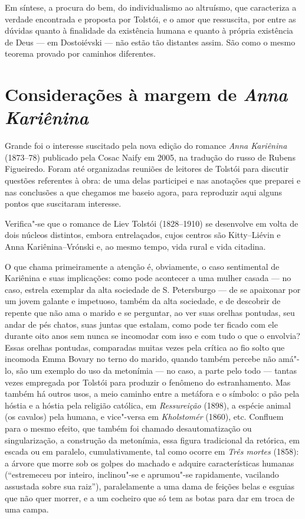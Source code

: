 {{Em síntese, a procura do bem, do individualismo ao altruísmo, que
caracteriza a verdade encontrada e proposta por Tolstói, e o amor que
ressuscita, por entre as dúvidas quanto à finalidade da existência
humana e quanto à própria existência de Deus --- em Dostoiévski --- não estão
tão distantes assim. São como o mesmo teorema provado por caminhos
diferentes.

\chapter{Considerações à margem de \emph{Anna Kariênina}}

Grande foi o interesse suscitado pela nova edição do romance \emph{Anna
Kariênina} (1873--78) publicado pela Cosac Naify em 2005, na tradução do russo de Rubens Figueiredo. Foram até organizadas
reuniões de leitores de Tolstói para discutir questões referentes à
obra: de uma delas participei e nas anotações que preparei e nas
conclusões a que chegamos me baseio agora, para reproduzir aqui alguns
pontos que suscitaram interesse.

Verifica"-se que o romance de Liev Tolstói (1828--1910) se desenvolve em
volta de dois núcleos distintos, embora entrelaçados, cujos centros
são Kitty--Liévin e Anna Kariênina--Vrónski e, ao mesmo tempo, vida
rural e vida citadina.

O que chama primeiramente a atenção é, obviamente, o caso sentimental de
Kariênina e suas implicações: como pode acontecer a uma mulher
casada --- no caso, estrela exemplar da alta sociedade de S.
Petersburgo --- de se apaixonar por um jovem galante e impetuoso, também
da alta sociedade, e de descobrir de repente que não ama o marido e se
perguntar, ao ver suas orelhas pontudas, seu andar de pés chatos, suas
juntas que estalam, como pode ter ficado com ele durante oito anos sem
nunca se incomodar com isso e com tudo o que o envolvia? Essas orelhas
pontudas, comparadas muitas vezes pela crítica ao fio solto que incomoda
Emma Bovary no terno do marido, quando também percebe não amá"-lo, são um
exemplo do uso da metonímia --- no caso, a parte pelo todo --- tantas
vezes empregada por Tolstói para produzir o fenômeno do estranhamento.
Mas também há outros usos, a meio caminho entre a metáfora e o símbolo:
o pão pela hóstia e a hóstia pela religião católica,
em \emph{Ressureição} (1898), a espécie animal (os cavalos) pela
humana, e vice"-versa em \emph{Kholstomér} (1860), etc. Confluem para o
mesmo efeito, que também foi chamado desautomatização ou
singularização, a construção da metonímia, essa figura tradicional da
retórica, em escada ou em paralelo, cumulativamente, tal como
ocorre em \emph{Três mortes} (1858): a árvore que morre sob os golpes
do machado e adquire características humanas (``estremeceu por
inteiro, inclinou"-se e aprumou"-se rapidamente, vacilando assustada sobre
sua raiz''), paralelamente a uma dama de feições belas e esguias que
não quer morrer, e a um cocheiro que só tem as botas para dar em troca
de uma campa.

}}
